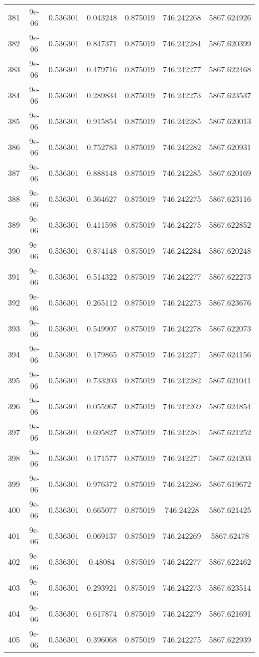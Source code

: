 \begin{table}
\begin{tabular*}{\linewidth}{c|c|c|c|c|c|c}
381 & 9e-06 & 0.536301 & 0.043248 & 0.875019 & 746.242268 & 5867.624926\\
382 & 9e-06 & 0.536301 & 0.847371 & 0.875019 & 746.242284 & 5867.620399\\
383 & 9e-06 & 0.536301 & 0.479716 & 0.875019 & 746.242277 & 5867.622468\\
384 & 9e-06 & 0.536301 & 0.289834 & 0.875019 & 746.242273 & 5867.623537\\
385 & 9e-06 & 0.536301 & 0.915854 & 0.875019 & 746.242285 & 5867.620013\\
386 & 9e-06 & 0.536301 & 0.752783 & 0.875019 & 746.242282 & 5867.620931\\
387 & 9e-06 & 0.536301 & 0.888148 & 0.875019 & 746.242285 & 5867.620169\\
388 & 9e-06 & 0.536301 & 0.364627 & 0.875019 & 746.242275 & 5867.623116\\
389 & 9e-06 & 0.536301 & 0.411598 & 0.875019 & 746.242275 & 5867.622852\\
390 & 9e-06 & 0.536301 & 0.874148 & 0.875019 & 746.242284 & 5867.620248\\
391 & 9e-06 & 0.536301 & 0.514322 & 0.875019 & 746.242277 & 5867.622273\\
392 & 9e-06 & 0.536301 & 0.265112 & 0.875019 & 746.242273 & 5867.623676\\
393 & 9e-06 & 0.536301 & 0.549907 & 0.875019 & 746.242278 & 5867.622073\\
394 & 9e-06 & 0.536301 & 0.179865 & 0.875019 & 746.242271 & 5867.624156\\
395 & 9e-06 & 0.536301 & 0.733203 & 0.875019 & 746.242282 & 5867.621041\\
396 & 9e-06 & 0.536301 & 0.055967 & 0.875019 & 746.242269 & 5867.624854\\
397 & 9e-06 & 0.536301 & 0.695827 & 0.875019 & 746.242281 & 5867.621252\\
398 & 9e-06 & 0.536301 & 0.171577 & 0.875019 & 746.242271 & 5867.624203\\
399 & 9e-06 & 0.536301 & 0.976372 & 0.875019 & 746.242286 & 5867.619672\\
400 & 9e-06 & 0.536301 & 0.665077 & 0.875019 & 746.24228 & 5867.621425\\
401 & 9e-06 & 0.536301 & 0.069137 & 0.875019 & 746.242269 & 5867.62478\\
402 & 9e-06 & 0.536301 & 0.48084 & 0.875019 & 746.242277 & 5867.622462\\
403 & 9e-06 & 0.536301 & 0.293921 & 0.875019 & 746.242273 & 5867.623514\\
404 & 9e-06 & 0.536301 & 0.617874 & 0.875019 & 746.242279 & 5867.621691\\
405 & 9e-06 & 0.536301 & 0.396068 & 0.875019 & 746.242275 & 5867.622939\\
\end{tabular*}
\end{table}
